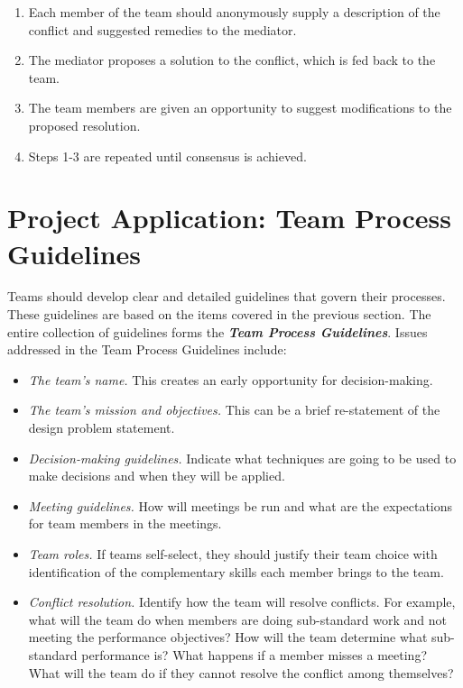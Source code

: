 \begin{enumerate}
\def\labelenumi{\arabic{enumi}.}
\item
  Each member of the team should anonymously supply a description of the
  conflict and suggested remedies to the mediator.
\item
  The mediator proposes a solution to the conflict, which is fed back to
  the team.
\item
  The team members are given an opportunity to suggest modifications to
  the proposed resolution.
\item
  Steps 1-3 are repeated until consensus is achieved.
\end{enumerate}

\section{Project Application: Team Process Guidelines}
\label{section:project-application-team-process-guidelines}

Teams should develop clear and detailed guidelines that govern their
processes. These guidelines are based on the items covered in the
previous section. The entire collection of guidelines forms the
\emph{\textbf{Team Process Guidelines}}. Issues addressed in the Team
Process Guidelines include:

\begin{itemize}
\item
  \emph{The team's name.} This creates an early opportunity for
  decision-making.
\item
  \emph{The team's mission and objectives.} This can be a brief
  re-statement of the design problem statement.
\item
  \emph{Decision-making guidelines.} Indicate what techniques are going
  to be used to make decisions and when they will be applied.
\item
  \emph{Meeting guidelines.} How will meetings be run and what are the
  expectations for team members in the meetings.
\item
  \emph{Team roles.} If teams self-select, they should justify their
  team choice with identification of the complementary skills each
  member brings to the team.
\item
  \emph{Conflict resolution.} Identify how the team will resolve
  conflicts. For example, what will the team do when members are doing
  sub-standard work and not meeting the performance objectives? How will
  the team determine what sub-standard performance is? What happens if a
  member misses a meeting? What will the team do if they cannot resolve
  the conflict among themselves?
\end{itemize}

